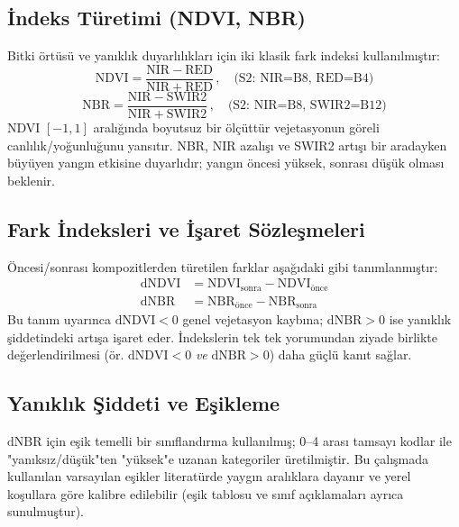 \documentclass[11pt,a4paper]{article}
\begin{document}
\subsection{İndeks Türetimi (NDVI, NBR)}
Bitki örtüsü ve yanıklık duyarlılıkları için iki klasik fark indeksi kullanılmıştır:
\begin{equation}
\mathrm{NDVI} = \frac{\mathrm{NIR}-\mathrm{RED}}{\mathrm{NIR}+\mathrm{RED}}\,, \quad \text{(S2: NIR=B8, RED=B4)}
\end{equation}
\begin{equation}
\mathrm{NBR} = \frac{\mathrm{NIR}-\mathrm{SWIR2}}{\mathrm{NIR}+\mathrm{SWIR2}}\,, \quad \text{(S2: NIR=B8, SWIR2=B12)}
\end{equation}
NDVI \([-1,1]\) aralığında boyutsuz bir ölçüttür vejetasyonun göreli canlılık/yoğunluğunu yansıtır. NBR, NIR azalışı ve SWIR2 artışı bir aradayken büyüyen yangın etkisine duyarlıdır; yangın öncesi yüksek, sonrası düşük olması beklenir.

\subsection{Fark İndeksleri ve İşaret Sözleşmeleri}
Öncesi/sonrası kompozitlerden türetilen farklar aşağıdaki gibi tanımlanmıştır:
\begin{align}
\mathrm{dNDVI} &= \mathrm{NDVI}_{\text{sonra}} - \mathrm{NDVI}_{\text{önce}}\\
\mathrm{dNBR}  &= \mathrm{NBR}_{\text{önce}} - \mathrm{NBR}_{\text{sonra}}
\end{align}
Bu tanım uyarınca \(\mathrm{dNDVI}<0\) genel vejetasyon kaybına; \(\mathrm{dNBR}>0\) ise yanıklık şiddetindeki artışa işaret eder. İndekslerin tek tek yorumundan ziyade birlikte değerlendirilmesi (ör. \(\mathrm{dNDVI}<0\) \emph{ve} \(\mathrm{dNBR}>0\)) daha güçlü kanıt sağlar.

\subsection{Yanıklık Şiddeti ve Eşikleme}
\(\mathrm{dNBR}\) için eşik temelli bir sınıflandırma kullanılmış; 0--4 arası tamsayı kodlar ile "yanıksız/düşük"ten "yüksek"e uzanan kategoriler üretilmiştir. Bu çalışmada kullanılan varsayılan eşikler literatürde yaygın aralıklara dayanır ve yerel koşullara göre kalibre edilebilir (eşik tablosu ve sınıf açıklamaları ayrıca sunulmuştur).
\end{document}
